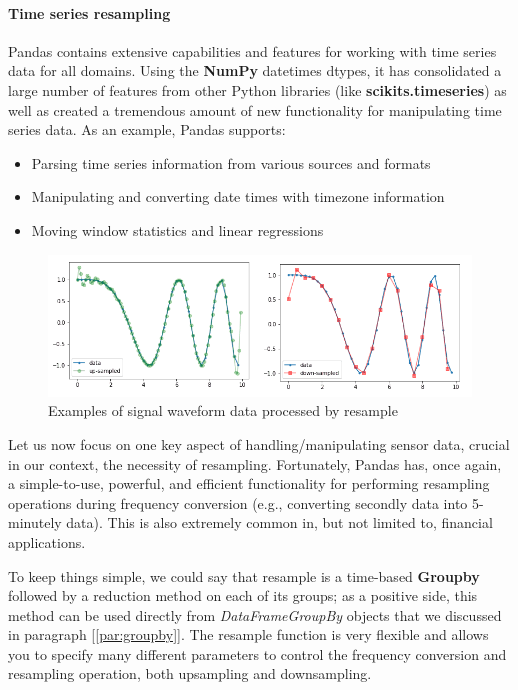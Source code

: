 \paragraph{Time series resampling}
Pandas contains extensive capabilities and features for working with time series data for all domains. Using the \textbf{NumPy} datetimes dtypes, it has consolidated a large number of features from other Python libraries (like \textbf{scikits.timeseries}) as well as created a tremendous amount of new functionality for manipulating time series data.
As an example, Pandas supports:
\begin{itemize}
    \item Parsing time series information from various sources and formats
    \item Manipulating and converting date times with timezone information
    \item Moving window statistics and linear regressions
\end{itemize}
\begin{figure}[ht]
    \centering
    \includegraphics[width=\linewidth]{content/chapter_3/images/up-down-sample.png}
    \caption{Examples of signal waveform data processed by resample}\label{fig:up and down sampling}
\end{figure}
Let us now focus on one key aspect of handling/manipulating sensor data, crucial in our context, the necessity of resampling.
Fortunately, Pandas has, once again, a simple-to-use, powerful, and efficient functionality for performing resampling operations during frequency conversion (e.g., converting  secondly data into 5-minutely data). This is also extremely common in, but not limited to, financial applications.

To keep things simple, we could say that resample is a time-based \textbf{Groupby} followed by a reduction method on each of its groups; as a positive side, this method can be used directly from \textit{DataFrameGroupBy} objects that we discussed in paragraph [\ref{par:groupby}]. 
The resample function is very flexible and allows you to specify many different parameters to control the frequency conversion and resampling operation, both upsampling and downsampling.
